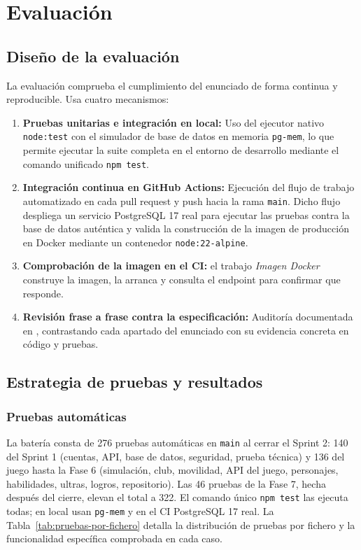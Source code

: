 \chapter{Evaluación}
\label{cap:evaluacion}

\section{Diseño de la evaluación}

La evaluación comprueba el cumplimiento del enunciado de forma continua y reproducible. Usa cuatro mecanismos:
\begin{enumerate}
    \item \textbf{Pruebas unitarias e integración en local:} Uso del ejecutor nativo \texttt{node:test} con el simulador de base de datos en memoria \texttt{pg-mem}, lo que permite ejecutar la suite completa en el entorno de desarrollo mediante el comando unificado \texttt{npm test}.
    \item \textbf{Integración continua en GitHub Actions:} Ejecución del flujo de trabajo automatizado en cada pull request y push hacia la rama \texttt{main}. Dicho flujo despliega un servicio PostgreSQL 17 real para ejecutar las pruebas contra la base de datos auténtica y valida la construcción de la imagen de producción en Docker mediante un contenedor \texttt{node:22-alpine}.
    \item \textbf{Comprobación de la imagen en el CI:} el trabajo \textit{Imagen Docker} construye la imagen, la arranca y consulta el endpoint  para confirmar que responde.
    \item \textbf{Revisión frase a frase contra la especificación:} Auditoría documentada en , contrastando cada apartado del enunciado con su evidencia concreta en código y pruebas.
\end{enumerate}

\section{Estrategia de pruebas y resultados}

\subsection{Pruebas automáticas}

La batería consta de 276 pruebas automáticas en \texttt{main} al cerrar el Sprint 2: 140 del Sprint 1 (cuentas, API, base de datos, seguridad, prueba técnica) y 136 del juego hasta la Fase 6 (simulación, club, movilidad, API del juego, personajes, habilidades, ultras, logros, repositorio). Las 46 pruebas de la Fase 7, hecha después del cierre, elevan el total a 322. El comando único \texttt{npm test} las ejecuta todas; en local usan \texttt{pg-mem} y en el CI PostgreSQL 17 real. La Tabla~\ref{tab:pruebas-por-fichero} detalla la distribución de pruebas por fichero y la funcionalidad específica comprobada en cada caso.

